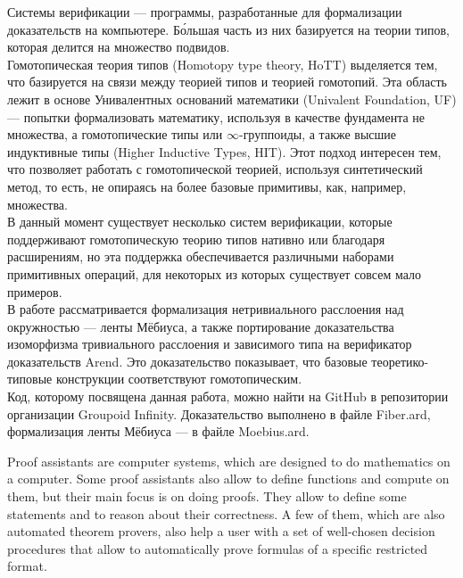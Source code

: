 







\Annot

Системы верификации --- программы, разработанные для формализации доказательств на компьютере. Б\'{о}льшая часть из них базируется на теории типов, которая делится на множество подвидов.\\
Гомотопическая теория типов (Homotopy type theory, HoTT) выделяется тем, что базируется на связи между теорией типов и теорией гомотопий. Эта область лежит в основе Унивалентных оснований математики (Univalent Foundation, UF) --- попытки формализовать математику, используя в качестве фундамента не множества, а гомотопические типы или $\infty$-группоиды, а также высшие индуктивные типы (Higher Inductive Types, HIT). Этот подход интересен тем, что позволяет работать с гомотопической теорией, используя синтетический метод, то есть, не опираясь на более базовые примитивы, как, например, множества.\\
В данный момент существует несколько систем верификации, которые поддерживают гомотопическую теорию типов нативно или благодаря расширениям, но эта поддержка обеспечивается различными наборами примитивных операций, для некоторых из которых существует совсем мало примеров.\\
В работе рассматривается формализация нетривиального расслоения над окружностью --- ленты Мёбиуса, а также портирование доказательства изоморфизма тривиального расслоения и зависимого типа на верификатор доказательств Arend. Это доказательство показывает, что базовые теоретико-типовые конструкции соответствуют гомотопическим.\\
Код, которому посвящена данная работа, можно найти на GitHub\autocite{Grp1} в репозитории организации Groupoid Infinity. Доказательство выполнено в файле Fiber.ard\autocite{Fiber}, формализация ленты Мёбиуса --- в файле Moebius.ard\autocite{Moebius}.

\Introduction

Proof assistants are computer systems, which are designed to do mathematics on a computer. Some proof assistants also allow to define functions and compute on them, but their main focus is on doing proofs. They allow to define some statements and to reason about their correctness. A few of them, which are also automated theorem provers, also help a user with a set of well-chosen decision procedures that allow to automatically prove formulas of a specific restricted format\autocite{ProofAssistants1}.

